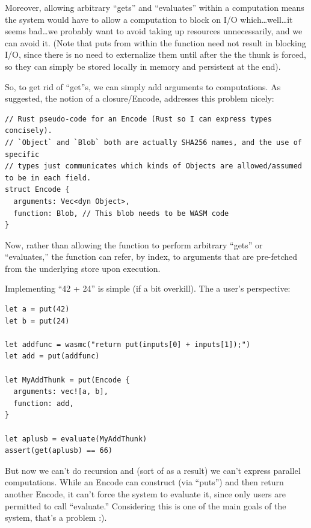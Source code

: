 \documentclass{article}
\newcommand{\bs}{\vspace{\baselineskip}}
\begin{document}
\bs

Moreover, allowing arbitrary ``gets'' and ``evaluates'' within a
computation means the system would have to allow a computation to
block on I/O which\ldots well\ldots it seems bad\ldots we probably want to
avoid taking up resources unnecessarily, and we can avoid it. (Note
that puts from within the function need not result in blocking I/O,
since there is no need to externalize them until after the the thunk
is forced, so they can simply be stored locally in memory and
persistent at the end).

\bs

So, to get rid of ``get''s, we can simply add arguments to computations. As suggested, the notion of a closure/Encode, addresses this problem nicely:

\begin{verbatim}
// Rust pseudo-code for an Encode (Rust so I can express types concisely).
// `Object` and `Blob` both are actually SHA256 names, and the use of specific
// types just communicates which kinds of Objects are allowed/assumed to be in each field.
struct Encode {
  arguments: Vec<dyn Object>,
  function: Blob, // This blob needs to be WASM code
}
\end{verbatim}

Now, rather than allowing the function to perform arbitrary ``gets''
or ``evaluates,'' the function can refer, by index, to arguments that
are pre-fetched from the underlying store upon execution.

\bs

Implementing ``42 + 24'' is simple (if a bit overkill). The a user's perspective:

\bs

\begin{verbatim}
let a = put(42)
let b = put(24)

let addfunc = wasmc("return put(inputs[0] + inputs[1]);")
let add = put(addfunc)

let MyAddThunk = put(Encode {
  arguments: vec![a, b],
  function: add,
}

let aplusb = evaluate(MyAddThunk)
assert(get(aplusb) == 66)
\end{verbatim}

But now we can't do recursion and (sort of as a result) we can't
express parallel computations. While an Encode can construct (via
``puts'') and then return another Encode, it can't force the system to
evaluate it, since only users are permitted to call ``evaluate.''
Considering this is one of the main goals of the system, that's a
problem :).
\end{document}
